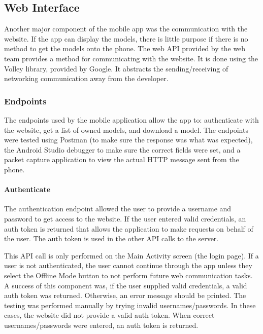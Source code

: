     \subsection{Web Interface}

        Another major component of the mobile app was the communication with the website.  If the app can display the models, there is little purpose if there is no method to get the models onto the phone.  The web API provided by the web team provides a method for communicating with the website.  It is done using the Volley library, provided by Google.  It abstracts the sending/receiving of networking communication away from the developer.
        
        \subsubsection{Endpoints}
        
            The endpoints used by the mobile application allow the app to: authenticate with the website, get a list of owned models, and download a model.  The endpoints were tested using Postman (to make sure the response was what was expected), the Android Studio debugger to make sure the correct fields were set, and a packet capture application to view the actual HTTP message sent from the phone.

            \paragraph{Authenticate}

                The authentication endpoint allowed the user to provide a username and password to get access to the website.  If the user entered valid credentials, an auth token is returned that allows the application to make requests on behalf of the user.  The auth token is used in the other API calls to the server.

                This API call is only performed on the Main Activity screen (the login page).  If a user is not authenticated, the user cannot continue through the app unless they select the Offline Mode button to not perform future web communication tasks.  A success of this component was, if the user supplied valid credentials, a valid auth token was returned.  Otherwise, an error message should be printed.  The testing was performed manually by trying invalid usernames/passwords.  In these cases, the website did not provide a valid auth token.  When correct usernames/passwords were entered, an auth token is returned.
            
